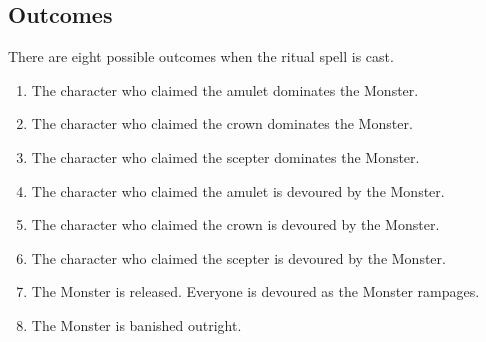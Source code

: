 \documentclass[10pt, parskip=half-, twoside]{scrartcl}
\begin{document}
\subsection*{Outcomes}
There are eight possible outcomes when the ritual spell is cast.
\begin{enumerate}[itemindent=*, leftmargin=*]
\item The character who claimed the amulet dominates the Monster.%
\item The character who claimed the crown dominates the Monster.%
\item The character who claimed the scepter dominates the Monster.%
\item The character who claimed the amulet is devoured by the Monster.%
\item The character who claimed the crown is devoured by the Monster. %
\item The character who claimed the scepter is devoured by the Monster.%
\item The Monster is released. Everyone is devoured as the Monster rampages.
\item The Monster is banished outright.
\end{enumerate}
\end{document}
